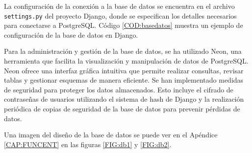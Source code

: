 La configuración de la conexión a la base de datos se encuentra en el archivo \texttt{settings.py} del proyecto Django, donde se especifican los detalles necesarios para conectarse a PostgreSQL. Código \ref{COD:basedatos} muestra un ejemplo de configuración de la base de datos en Django.

Para la administración y gestión de la base de datos, se ha utilizado Neon, una herramienta que facilita la visualización y manipulación de datos de PostgreSQL. Neon ofrece una interfaz gráfica intuitiva que permite realizar consultas, revisar tablas y gestionar esquemas de manera eficiente.
Se han implementado medidas de seguridad para proteger los datos almacenados. Esto incluye el cifrado de contraseñas de usuarios utilizando el sistema de hash de Django y la realización periódica de copias de seguridad de la base de datos para prevenir pérdidas de datos.

Una imagen del diseño de la base de datos se puede ver en el Apéndice \ref{CAP:FUNCENT} en las figuras \ref{FIG:db1} y \ref{FIG:db2}.